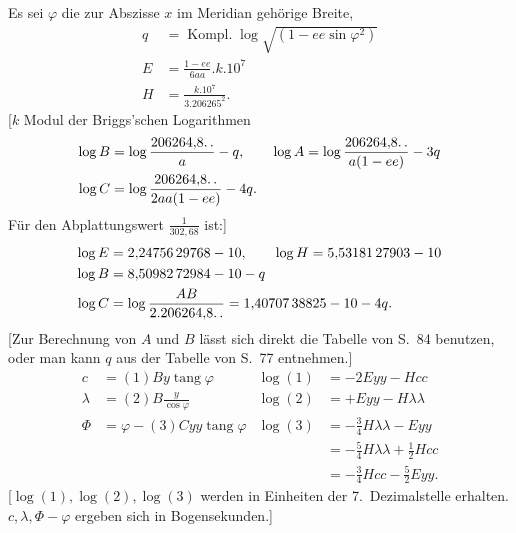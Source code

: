 Es sei \(\varphi\) die zur Abszisse \(x\) im Meridian gehörige Breite,
\[
\begin{aligned}
q&=\operatorname{Kompl.}\log\sqrt{(1-ee\sin\varphi^2)}\\
E&=\frac{1-ee}{6aa}.k.10^7\\
H&=\frac{k.10^7}{3.206265^2}.
\end{aligned}
\]
[\(k\) Modul der Briggs'schen Logarithmen
\[
\begin{aligned}
\log B&=\log\frac{206264{,}8\ldotp\ldotp}a-q,\qquad\log A=\log\frac{206264{,}8\ldotp\ldotp}{a(1-ee)}-3q\\
\log C&=\log\frac{206264{,}8\ldotp\ldotp}{2aa(1-ee)}-4q.
\end{aligned}
\]
Für den Abplattungswert \(\frac1{302{,}68}\) ist:]
\[
\begin{aligned}
\log E&=2{,}24756\,29768-10,\qquad\log H=5{,}53181\,27903-10\\
\log B&=8{,}50982\,72984-10-q\\
\log C&=\log\frac{AB}{2.206264{,}8\ldotp\ldotp}=1{,}40707\,38825-10-4q.
\end{aligned}
\]
[Zur Berechnung von \(A\) und \(B\) lässt sich direkt die Tabelle von S.~84 benutzen, oder man kann \(q\) aus der Tabelle von S.~77 entnehmen.]
\[
\begin{aligned}
c&=(1)By\operatorname{tang}\varphi&\log(1)&=-2Eyy-Hcc\\
\lambda&=(2)B\frac y{\cos\varphi}&\log(2)&=+Eyy-H\lambda\lambda\\
\Phi&=\varphi-(3)Cyy\operatorname{tang}\varphi&\log(3)&=-\tfrac34H\lambda\lambda-Eyy\\
&&&=-\tfrac54H\lambda\lambda+\tfrac12Hcc\\
&&&=-\tfrac34Hcc-\tfrac52Eyy.
\end{aligned}
\]
[\(\log(1),\log(2),\log(3)\) werden in Einheiten der 7.~Dezimalstelle erhalten. \(c,\lambda,\Phi-\varphi\) ergeben sich in Bogensekunden.]
